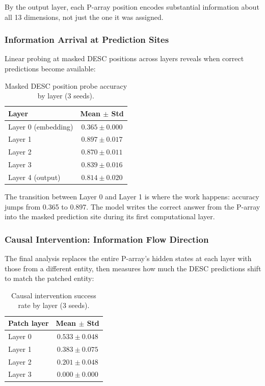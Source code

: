 \documentclass{article}
\begin{document}
By the output layer, each P-array position encodes substantial information about all 13 dimensions, not just the one it was assigned.

\subsubsection{Information Arrival at Prediction Sites}

Linear probing at masked DESC positions across layers reveals when correct predictions become available:

\begin{table}[htbp]
\centering
\small
\begin{tabular}{lc}
\toprule
Layer & Mean $\pm$ Std \\
\midrule
Layer 0 (embedding) & $0.365 \pm 0.000$ \\
Layer 1 & $0.897 \pm 0.017$ \\
Layer 2 & $0.870 \pm 0.011$ \\
Layer 3 & $0.839 \pm 0.016$ \\
Layer 4 (output) & $0.814 \pm 0.020$ \\
\bottomrule
\end{tabular}
\caption{Masked DESC position probe accuracy by layer (3 seeds).}
\label{tab:infoarrival}
\end{table}

The transition between Layer 0 and Layer 1 is where the work happens: accuracy jumps from 0.365 to 0.897. The model writes the correct answer from the P-array into the masked prediction site during its first computational layer.

\subsubsection{Causal Intervention: Information Flow Direction}

The final analysis replaces the entire P-array's hidden states at each layer with those from a different entity, then measures how much the DESC predictions shift to match the patched entity:

\begin{table}[htbp]
\centering
\small
\begin{tabular}{lc}
\toprule
Patch layer & Mean $\pm$ Std \\
\midrule
Layer 0 & $0.533 \pm 0.048$ \\
Layer 1 & $0.383 \pm 0.075$ \\
Layer 2 & $0.201 \pm 0.048$ \\
Layer 3 & $0.000 \pm 0.000$ \\
\bottomrule
\end{tabular}
\caption{Causal intervention success rate by layer (3 seeds).}
\label{tab:causal}
\end{table}
\end{document}
